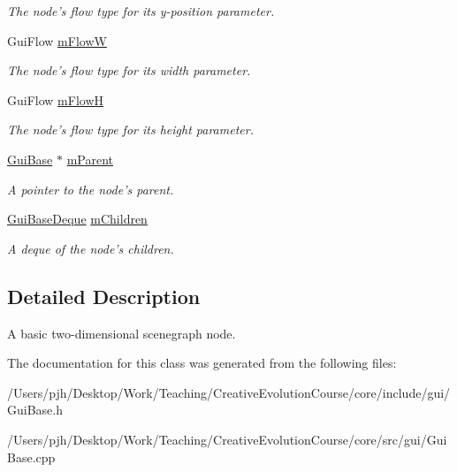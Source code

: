 \begin{DoxyCompactItemize}
\begin{DoxyCompactList}\small\item\em The node's flow type for its y-\/position parameter. \end{DoxyCompactList}\item 
\hypertarget{class_gui_base_a711b5c3c6b09852ac826186c922467a9}{Gui\-Flow \hyperlink{class_gui_base_a711b5c3c6b09852ac826186c922467a9}{m\-Flow\-W}}\label{class_gui_base_a711b5c3c6b09852ac826186c922467a9}

\begin{DoxyCompactList}\small\item\em The node's flow type for its width parameter. \end{DoxyCompactList}\item 
\hypertarget{class_gui_base_a2e9922cfe6e65ade8010d65afaa643a7}{Gui\-Flow \hyperlink{class_gui_base_a2e9922cfe6e65ade8010d65afaa643a7}{m\-Flow\-H}}\label{class_gui_base_a2e9922cfe6e65ade8010d65afaa643a7}

\begin{DoxyCompactList}\small\item\em The node's flow type for its height parameter. \end{DoxyCompactList}\item 
\hypertarget{class_gui_base_adc9738a64a6a41862ff8eb94d482b7c6}{\hyperlink{class_gui_base}{Gui\-Base} $\ast$ \hyperlink{class_gui_base_adc9738a64a6a41862ff8eb94d482b7c6}{m\-Parent}}\label{class_gui_base_adc9738a64a6a41862ff8eb94d482b7c6}

\begin{DoxyCompactList}\small\item\em A pointer to the node's parent. \end{DoxyCompactList}\item 
\hypertarget{class_gui_base_afce12e9e9fd92ce71e945cff1dc87b0e}{\hyperlink{class_gui_base_a0f3e57c1a942210072030196844b22eb}{Gui\-Base\-Deque} \hyperlink{class_gui_base_afce12e9e9fd92ce71e945cff1dc87b0e}{m\-Children}}\label{class_gui_base_afce12e9e9fd92ce71e945cff1dc87b0e}

\begin{DoxyCompactList}\small\item\em A deque of the node's children. \end{DoxyCompactList}\end{DoxyCompactItemize}


\subsection{Detailed Description}
A basic two-\/dimensional scenegraph node. 

The documentation for this class was generated from the following files\-:\begin{DoxyCompactItemize}
\item 
/\-Users/pjh/\-Desktop/\-Work/\-Teaching/\-Creative\-Evolution\-Course/core/include/gui/Gui\-Base.\-h\item 
/\-Users/pjh/\-Desktop/\-Work/\-Teaching/\-Creative\-Evolution\-Course/core/src/gui/Gui\-Base.\-cpp\end{DoxyCompactItemize}
